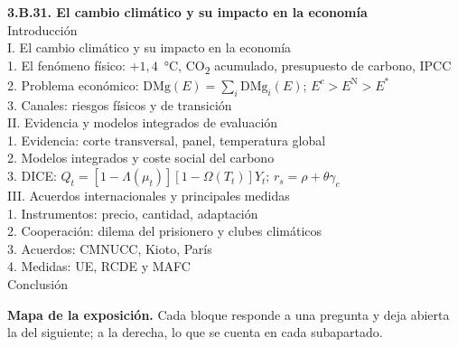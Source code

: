 \documentclass[11pt]{article}
\begin{document}
\begin{esquema}
\textbf{3.B.31. El cambio climático y su impacto en la economía}\\[2pt]
Introducción\\
I. El cambio climático y su impacto en la economía\\
\hspace*{1.5em}1. El fenómeno físico: $+1{,}4$~°C, CO\textsubscript{2} acumulado, presupuesto de carbono, IPCC\\
\hspace*{1.5em}2. Problema económico: $\mathrm{DMg}(E)=\sum_i\mathrm{DMg}_i(E)$; $E^c>E^{\mathrm{N}}>E^*$\\
\hspace*{1.5em}3. Canales: riesgos físicos y de transición\\
II. Evidencia y modelos integrados de evaluación\\
\hspace*{1.5em}1. Evidencia: corte transversal, panel, temperatura global\\
\hspace*{1.5em}2. Modelos integrados y coste social del carbono\\
\hspace*{1.5em}3. DICE: $Q_t=[1-\Lambda(\mu_t)][1-\Omega(T_t)]Y_t$; $r_s=\rho+\theta\gamma_c$\\
III. Acuerdos internacionales y principales medidas\\
\hspace*{1.5em}1. Instrumentos: precio, cantidad, adaptación\\
\hspace*{1.5em}2. Cooperación: dilema del prisionero y clubes climáticos\\
\hspace*{1.5em}3. Acuerdos: CMNUCC, Kioto, París\\
\hspace*{1.5em}4. Medidas: UE, RCDE y MAFC\\
Conclusión
\end{esquema}

\begin{anotaciones}
\textbf{Mapa de la exposición.} Cada bloque responde a una pregunta y deja abierta la del siguiente; a la derecha, lo que se cuenta en cada subapartado.
\begin{infografiacaja}
\caption{Mapa del tema: la pregunta de cada bloque y el hilo que los une}\label{figu:mapa-tema}
\end{infografiacaja}
\end{anotaciones}
\end{document}
